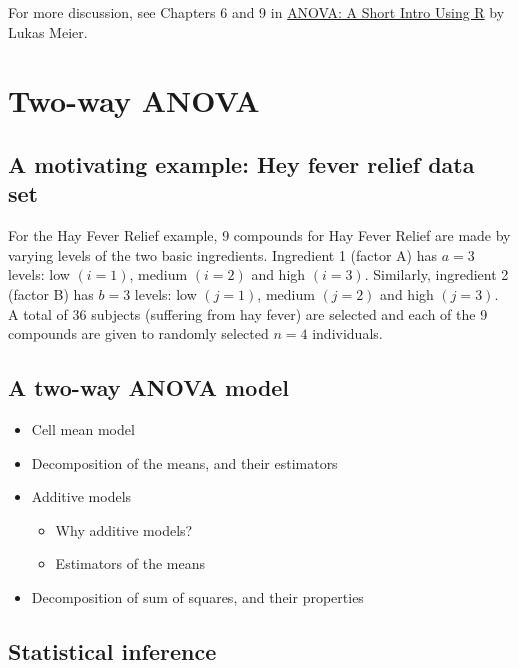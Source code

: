 \documentclass[12pt,]{book}
\providecommand{\tightlist}{%
  \setlength{\itemsep}{0pt}\setlength{\parskip}{0pt}}
\begin{document}
For more discussion, see Chapters 6 and 9 in
\href{https://stat.ethz.ch/~meier/teaching/anova/}{ANOVA: A Short Intro
Using R} by Lukas Meier.

\section{Two-way ANOVA}\label{two-way-anova}

\subsection{A motivating example: Hey fever relief data
set}\label{a-motivating-example-hey-fever-relief-data-set}

For the Hay Fever Relief example, 9 compounds for Hay Fever Relief are
made by varying levels of the two basic ingredients. Ingredient 1
(factor A) has \(a = 3\) levels: low \((i = 1)\), medium \((i = 2)\) and
high \((i = 3)\). Similarly, ingredient 2 (factor B) has \(b = 3\)
levels: low \((j = 1)\), medium \((j = 2)\) and high \((j = 3)\). A
total of 36 subjects (suffering from hay fever) are selected and each of
the 9 compounds are given to randomly selected \(n = 4\) individuals.

\subsection{A two-way ANOVA model}\label{a-two-way-anova-model}

\begin{itemize}
\tightlist
\item
  Cell mean model
\item
  Decomposition of the means, and their estimators
\item
  Additive models

  \begin{itemize}
  \tightlist
  \item
    Why additive models?
  \item
    Estimators of the means
  \end{itemize}
\item
  Decomposition of sum of squares, and their properties
\end{itemize}

\subsection{Statistical inference}\label{statistical-inference-1}
\end{document}
